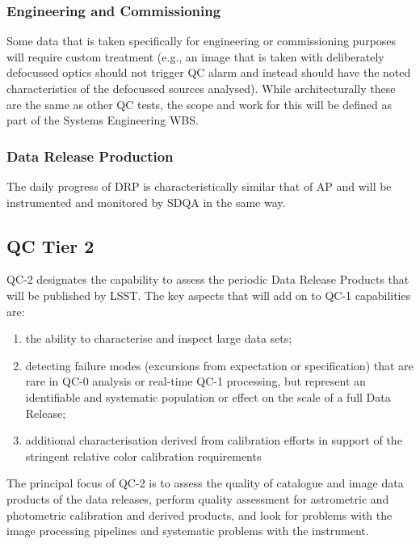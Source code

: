\documentclass[DM,toc,lsstdraft]{lsstdoc}
\begin{document}
\subsubsection{Engineering and Commissioning}

Some data that is taken specifically for engineering or commissioning purposes will require custom treatment (e.g., an image that is taken with deliberately defocussed optics should not trigger QC alarm and instead should have the noted characteristics of the defocussed sources analysed). While architecturally these are the same as other QC tests, the scope and work for this will be defined as part of the Systems Engineering WBS.

\subsubsection{Data Release Production}

The daily progress of DRP is characteristically similar that of AP and will be instrumented and monitored by SDQA in the same way.

\subsection{QC Tier 2}

QC-2 designates the capability to assess the periodic Data Release Products that will be published by LSST.  The key aspects that will add on to QC-1 capabilities are:

\begin{enumerate}

\item the ability to characterise and inspect large data sets;

\item detecting failure modes (excursions from expectation or specification) that are rare in QC-0 analysis or real-time QC-1 processing, but represent an identifiable and systematic population or effect on the scale of a full Data Release;

\item additional characterisation derived from calibration efforts in support of the stringent relative color calibration requirements

\end{enumerate}

The principal focus of QC-2 is to assess the quality of catalogue and image data products of the data releases, perform quality assessment for astrometric and photometric calibration and derived products, and look for problems with the image processing pipelines and systematic problems with the instrument.
\end{document}
